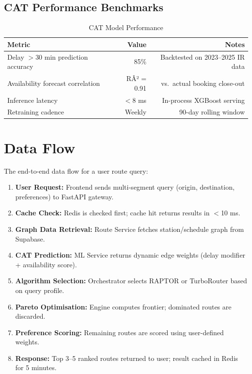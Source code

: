 \documentclass[12pt,a4paper]{report}
\begin{document}
\subsection*{CAT Performance Benchmarks}

\begin{table}[h!]
\centering
\caption{CAT Model Performance}
\begin{tabular}{lrr}
\toprule
\textbf{Metric} & \textbf{Value} & \textbf{Notes} \\
\midrule
Delay $>$30 min prediction accuracy & 85\% & Backtested on 2023--2025 IR data \\
Availability forecast correlation & RÂ² = 0.91 & vs.\ actual booking close-out \\
Inference latency & $<$8 ms & In-process XGBoost serving \\
Retraining cadence & Weekly & 90-day rolling window \\
\bottomrule
\end{tabular}
\end{table}

\section{Data Flow}

The end-to-end data flow for a user route query:

\begin{enumerate}[leftmargin=1.5em]
  \item \textbf{User Request:} Frontend sends multi-segment query (origin, destination, preferences) to FastAPI gateway.
  \item \textbf{Cache Check:} Redis is checked first; cache hit returns results in $<$10 ms.
  \item \textbf{Graph Data Retrieval:} Route Service fetches station/schedule graph from Supabase.
  \item \textbf{CAT Prediction:} ML Service returns dynamic edge weights (delay modifier + availability score).
  \item \textbf{Algorithm Selection:} Orchestrator selects RAPTOR or TurboRouter based on query profile.
  \item \textbf{Pareto Optimisation:} Engine computes frontier; dominated routes are discarded.
  \item \textbf{Preference Scoring:} Remaining routes are scored using user-defined weights.
  \item \textbf{Response:} Top 3--5 ranked routes returned to user; result cached in Redis for 5 minutes.
\end{enumerate}
\end{document}

